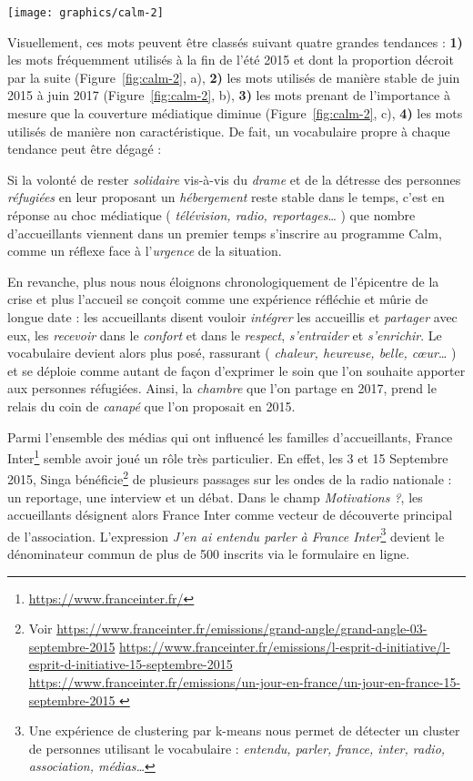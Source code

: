 \documentclass[symmetric,justified,marginals=raggedouter]{tufte-book}
\begin{document}
\begin{figure*}
  \texttt{[image: graphics/calm-2]}
  \caption{Évolution de la fréquence d'utilisation de certains termes du champ \textit{Motivations ?}}
  \label{fig:calm-2}
\end{figure*}

\noindent Visuellement, ces mots peuvent être classés suivant quatre grandes tendances : \textbf{1)} les mots fréquemment utilisés à la fin de l'été 2015 et dont la proportion décroit par la suite (Figure~\ref{fig:calm-2}, a), \textbf{2)} les mots utilisés de manière stable de juin 2015 à juin 2017 (Figure~\ref{fig:calm-2}, b), \textbf{3)} les mots prenant de l'importance à mesure que la couverture médiatique diminue (Figure~\ref{fig:calm-2}, c), \textbf{4)} les mots utilisés de manière non caractéristique. De fait, un vocabulaire propre à chaque tendance peut être dégagé :

Si la volonté de rester \textit{solidaire} vis-à-vis du \textit{drame} et de la détresse des personnes \textit{réfugiées} en leur proposant un \textit{hébergement} reste stable dans le temps, c'est en réponse au choc médiatique ( \textit{télévision, radio, reportages}\ldots{} ) que nombre d'accueillants viennent dans un premier temps s'inscrire au programme Calm, comme un réflexe face à l'\textit{urgence} de la situation.

En revanche, plus nous nous éloignons chronologiquement de l'épi\-centre de la crise et plus l'accueil se conçoit comme une expérience réfléchie et mûrie de longue date : les accueillants disent vouloir \textit{intégrer} les accueillis et \textit{partager} avec eux, les \textit{recevoir} dans le \textit{confort} et dans le \textit{respect}, \textit{s'entraider} et \textit{s'enrichir}. Le vocabulaire devient alors plus posé, rassurant ( \textit{chaleur, heureuse, belle, cœur}\ldots{} ) et se déploie comme autant de façon d'exprimer le soin que l'on souhaite apporter aux personnes réfugiées. Ainsi, la \textit{chambre} que l'on partage en 2017, prend le relais du coin de \textit{canapé} que l'on proposait en 2015.
   
Parmi l'ensemble des médias qui ont influencé les familles d'accueil\-lants, France Inter\footnote{\RaggedOuter \url{https://www.franceinter.fr/}} semble avoir joué un rôle très particulier. En effet, les 3 et 15 Septembre 2015, Singa bénéficie\footnote{\RaggedOuter Voir \url{https://www.franceinter.fr/emissions/grand-angle/grand-angle-03-septembre-2015} \url{https://www.franceinter.fr/emissions/l-esprit-d-initiative/l-esprit-d-initiative-15-septembre-2015} \url{https://www.franceinter.fr/emissions/un-jour-en-france/un-jour-en-france-15-septembre-2015 }} de plusieurs passages sur les ondes de la radio nationale : un reportage, une interview et un débat. Dans le champ \textit{Motivations ?}, les accueillants désignent alors France Inter comme vecteur de découverte principal de l'association. L'expression \og\textit{J'en ai entendu parler à France Inter}\fg{}\footnote{\RaggedOuter Une expérience de clustering par k-means nous permet de détecter un cluster de personnes utilisant le vocabulaire : \textit{entendu, parler, france, inter, radio, association, médias\ldots{}}} devient le dénominateur commun de plus de 500 inscrits via le formulaire en ligne. 
\end{document}

